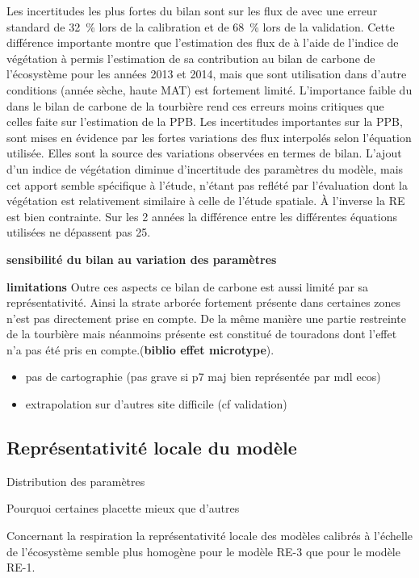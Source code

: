 Les incertitudes les plus fortes du bilan sont sur les flux de \chh avec une erreur standard de \SI{32}{\percent} lors de la calibration et de \SI{68}{\percent} lors de la validation.
Cette différence importante montre que l'estimation des flux de \chh à l'aide de l'indice de végétation à permis l'estimation de sa contribution au bilan de carbone de l'écosystème pour les années 2013 et 2014, mais que sont utilisation dans d'autre conditions (année sèche, haute MAT) est fortement limité.
L'importance faible du \chh dans le bilan de carbone de la tourbière rend ces erreurs moins critiques que celles faite sur l'estimation de la PPB.
Les incertitudes importantes sur la PPB, sont mises en évidence par les fortes variations des flux interpolés selon l'équation utilisée.
Elles sont la source des variations observées en termes de bilan.
L'ajout d'un indice de végétation diminue d'incertitude des paramètres du modèle, mais cet apport semble spécifique à l'étude, n'étant pas reflété par l'évaluation dont la végétation est relativement similaire à celle de l'étude spatiale.
À l'inverse la RE est bien contrainte.
Sur les 2 années la différence entre les différentes équations utilisées ne dépassent pas \SI{25}{\gcma}.

\textbf{sensibilité du bilan au variation des paramètres}

\textbf{limitations}
Outre ces aspects ce bilan de carbone est aussi limité par sa représentativité. 
Ainsi la strate arborée fortement présente dans certaines zones n'est pas directement prise en compte.
De la même manière une partie restreinte de la tourbière mais néanmoins présente est constitué de touradons dont l'effet n'a pas été pris en compte.\plop (\textbf{biblio effet microtype}).


\begin{itemize}
\item pas de cartographie (pas grave si p7 maj bien représentée par mdl ecos)
\item extrapolation sur d'autres site difficile (cf validation)
\end{itemize}

\subsection{Représentativité locale du modèle}

Distribution des paramètres

Pourquoi certaines placette mieux que d'autres

Concernant la respiration la représentativité locale des modèles calibrés à l'échelle de l'écosystème semble plus homogène pour le modèle RE-3 que pour le modèle RE-1.

